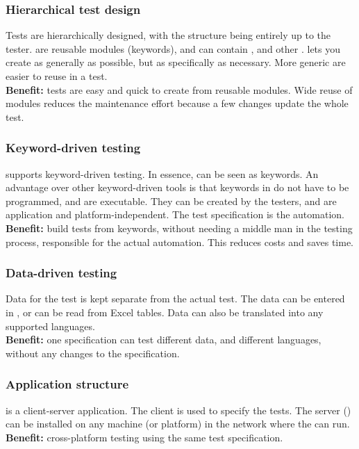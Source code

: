 \subsubsection{Hierarchical test design}
Tests are hierarchically designed, with the structure being entirely up to the tester. \gdcases{} are reusable modules (keywords), and can contain \gdsteps{}, and other \gdcases{}. \jb{} lets you create \gdcases{} as generally as possible, but as specifically as necessary. More generic \gdcases{} are easier to reuse in a test. \\
\textbf{Benefit:} tests are easy and quick to create from reusable modules. Wide reuse of modules reduces the maintenance effort because a few changes update the whole test.
 
\subsubsection{Keyword-driven testing}
\jb{} supports keyword-driven testing. In essence, \gdcases{} can be seen as keywords. An advantage over other keyword-driven tools is that keywords in \jb{} do not have to be programmed, and are executable. They can be created by the testers, and are application and platform-independent. The test specification is the automation. \\
\textbf{Benefit:} build tests from keywords, without needing a middle man in the testing process, responsible for the actual automation. This reduces costs and saves time. 

\subsubsection{Data-driven testing}
Data for the test is kept separate from the actual test. The data can be entered in \jb{}, or can be read from Excel tables. Data can also be translated into any \gdaut{} supported languages. \\
\textbf{Benefit:} one specification can test different data, and different languages, without any changes to the specification. 

\subsubsection{Application structure}
\jb{} is a client-server application. The client is used to specify the tests. The server (\gdserver{}) can be installed on any machine (or platform) in the network where the \gdaut{} can run. \\
\textbf{Benefit:} cross-platform testing using the same test specification.

